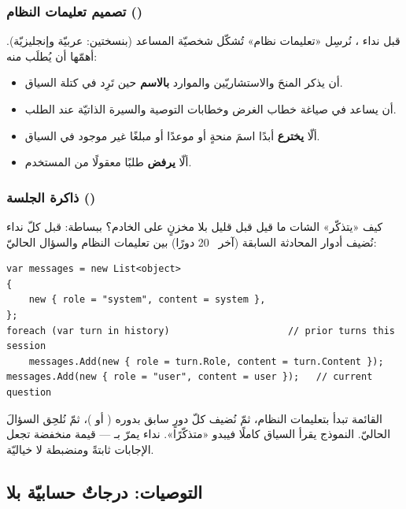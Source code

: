 \subsubsection{تصميم تعليمات النظام ()}

قبل نداء ، نُرسِل «تعليمات نظام» تُشكّل شخصيّة المساعد (بنسختين: عربيّة
وإنجليزيّة). أهمّها أن يُطلَب منه:

\begin{itemize}
  \item أن يذكر المنحَ والاستشاريّين والموارد \textbf{بالاسم} حين تَرِد في كتلة السياق.
  \item أن يساعد في صياغة خطاب الغرض وخطابات التوصية والسيرة الذاتيّة عند الطلب.
  \item ألّا \textbf{يخترع} أبدًا اسمَ منحةٍ أو موعدًا أو مبلغًا غير موجود في السياق.
  \item ألّا \textbf{يرفض} طلبًا معقولًا من المستخدم.
\end{itemize}

\subsubsection{ذاكرة الجلسة ()}

كيف «يتذكّر» الشات ما قيل قبل قليل بلا مخزنٍ على الخادم؟ ببساطة: قبل كلّ نداء نُضيف
أدوار المحادثة السابقة (آخر ~20 دورًا) بين تعليمات النظام والسؤال الحاليّ:

\begin{english}
\begin{lstlisting}[language={[Sharp]C}]
var messages = new List<object>
{
    new { role = "system", content = system },
};
foreach (var turn in history)                     // prior turns this session
    messages.Add(new { role = turn.Role, content = turn.Content });
messages.Add(new { role = "user", content = user });   // current question
\end{lstlisting}
\end{english}

القائمة تبدأ بتعليمات النظام، ثمّ نُضيف كلّ دورٍ سابق بدوره ( أو
)، ثمّ نُلحِق السؤالَ الحاليّ. النموذج يقرأ السياق كاملًا فيبدو
«متذكّرًا». نداء  يمرّ بـ  — قيمة منخفضة تجعل
الإجابات ثابتةً ومنضبطة لا خياليّة.

\subsection{التوصيات: درجاتٌ حسابيّة بلا }

